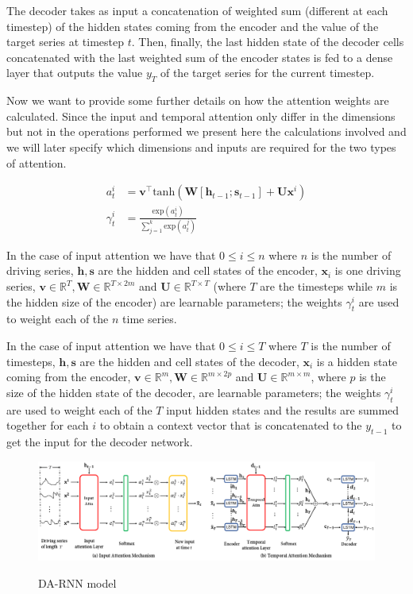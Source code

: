 \documentclass{article}
\begin{document}
The decoder takes as input a concatenation of weighted sum (different at each
timestep) of the hidden states coming
from the encoder and the value of the target series at timestep $t$. Then,
finally, the last hidden state of the decoder
cells concatenated with the last weighted sum of the encoder states is fed to a
dense layer that outputs the value
$y_T$ of the target series for the current timestep.

Now we want to provide some further details on how the attention weights are 
calculated. Since the input and temporal attention only differ in the dimensions 
but not in the operations performed we present here the calculations involved and 
we will later specify which dimensions and inputs are required for the two types 
of attention.

\begin{equation} \label{eq:attention}
\begin{split}
a_t^i &= \mathbf{v}^\top\text{tanh}(
		 \mathbf{W}[\mathbf{h}_{t-1};\mathbf{s}_{t-1}] +\mathbf{U}\mathbf{x}^i) \\
\gamma_t^i &= \frac{\text{exp}(a_t^i)}{\sum_{j=1}^k \text{exp}(a_t^j)}
\end{split}
\end{equation}

In the case of input attention we have that $0 \le i \le n$ where $n$ is the 
number of driving series, $\mathbf{h}, \mathbf{s}$ are the hidden and cell states 
of the encoder, $\mathbf{x}_i$ is one driving series, 
$\mathbf{v} \in \mathbb{R}^T, \mathbf{W} \in \mathbb{R}^{T\times 2m}$ and 
$\mathbf{U} \in \mathbb{R}^{T\times T}$ (where $T$ are the timesteps while $m$ is 
the hidden size of the encoder) are learnable parameters; the weights 
$\gamma_t^i$ are used to weight each of the $n$ time series.

In the case of input attention we have that $0 \le i \le T$ where $T$ is the 
number of timesteps, $\mathbf{h}, \mathbf{s}$ are the hidden and cell states 
of the decoder, $\mathbf{x}_i$ is a hidden state coming from the encoder, 
$\mathbf{v} \in \mathbb{R}^m, \mathbf{W} \in \mathbb{R}^{m\times 2p}$ and 
$\mathbf{U} \in \mathbb{R}^{m\times m}$, where $p$ is the size of the hidden 
state of the decoder, are learnable parameters; the weights 
$\gamma_t^i$ are used to weight each of the $T$ input hidden states and the 
results are summed together for each $i$ to obtain a context vector that is 
concatenated to the $y_{t-1}$ to get the input for the decoder network.

\begin{figure}[ht]
\centering
\includegraphics[width=\linewidth]{img/da-rnn.png} \\
\caption{DA-RNN model}
\label{fig:da-rnn}
\end{figure}
\end{document}
